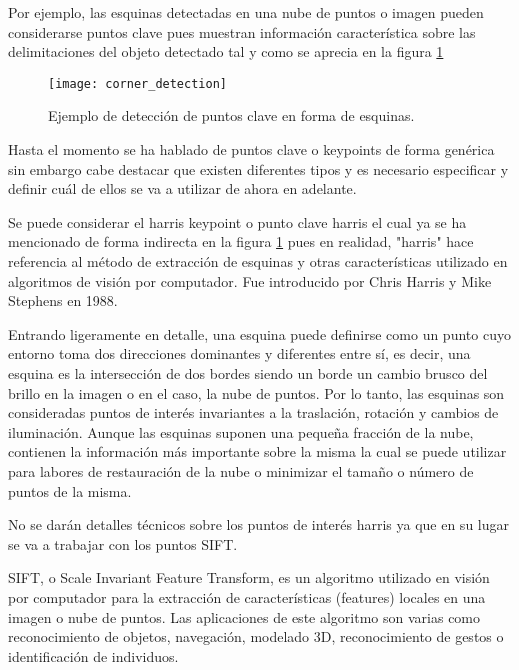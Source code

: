 
Por ejemplo, las esquinas detectadas en una nube de puntos o imagen pueden considerarse puntos clave pues muestran información característica sobre las delimitaciones del objeto detectado tal y como se aprecia en la figura \ref{fig:corner_detection}

\begin{figure}
\centering
\texttt{[image: corner\_detection]}
\caption{Ejemplo de detección de puntos clave en forma de esquinas.}\label{fig:corner_detection}
\end{figure}

Hasta el momento se ha hablado de puntos clave o keypoints de forma genérica sin embargo cabe destacar que existen diferentes tipos y es necesario especificar y definir cuál de ellos se va a utilizar de ahora en adelante.

Se puede considerar el harris keypoint o punto clave harris el cual ya se ha mencionado de forma indirecta en la figura \ref{fig:corner_detection} pues en realidad, "harris" hace referencia al método de extracción de esquinas y otras características utilizado en algoritmos de visión por computador. Fue introducido por Chris Harris y Mike Stephens en 1988.

Entrando ligeramente en detalle, una esquina puede definirse como un punto cuyo entorno toma dos direcciones dominantes y diferentes entre sí, es decir, una esquina es la intersección de dos bordes siendo un borde un cambio brusco del brillo en la imagen o en el caso, la nube de puntos. Por lo tanto, las esquinas son consideradas puntos de interés invariantes a la traslación, rotación y cambios de iluminación. 
Aunque las esquinas suponen una pequeña fracción de la nube, contienen la información más importante sobre la misma la cual se puede utilizar para labores de restauración de la nube o minimizar el tamaño o número de puntos de la misma.

No se darán detalles técnicos sobre los puntos de interés harris ya que en su lugar se va a trabajar con los puntos SIFT. 

SIFT, o Scale Invariant Feature Transform, es un algoritmo utilizado en visión por computador para la extracción de características (features) locales en una imagen o nube de puntos. Las aplicaciones de este algoritmo son varias como reconocimiento de objetos, navegación, modelado 3D, reconocimiento de gestos o identificación de individuos.

